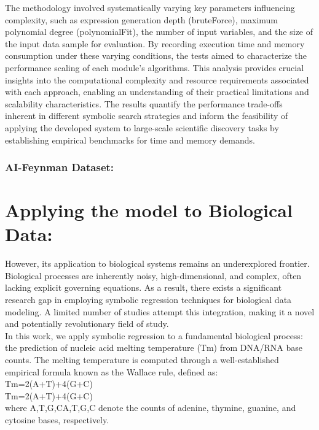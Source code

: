 \documentclass{article}
\begin{document}
{The methodology involved systematically varying key parameters influencing complexity, such as expression generation depth (bruteForce), maximum polynomial degree (polynomialFit), the number of input variables, and the size of the input data sample for evaluation. By recording execution time and memory consumption under these varying conditions, the tests aimed to characterize the performance scaling of each module's algorithms. This analysis provides crucial insights into the computational complexity and resource requirements associated with each approach, enabling an understanding of their practical limitations and scalability characteristics. The results quantify the performance trade-offs inherent in different symbolic search strategies and inform the feasibility of applying the developed system to large-scale scientific discovery tasks by establishing empirical benchmarks for time and memory demands.\\


\subsubsection{AI-Feynman Dataset: }


\section{ Applying the model to Biological Data: }

However, its application to biological systems remains an underexplored frontier. Biological processes are inherently noisy, high-dimensional, and complex, often lacking explicit governing equations. As a result, there exists a significant research gap in employing symbolic regression techniques for biological data modeling. A limited number of studies attempt this integration, making it a novel and potentially revolutionary field of study.\\

In this work, we apply symbolic regression to a fundamental biological process: the prediction of nucleic acid melting temperature (Tm) from DNA/RNA base counts. The melting temperature is computed through a well-established empirical formula known as the Wallace rule, defined as:\\
Tm=2(A+T)+4(G+C)\\
Tm=2(A+T)+4(G+C)\\

where A,T,G,CA,T,G,C denote the counts of adenine, thymine, guanine, and cytosine bases, respectively.\\

}
\end{document}
